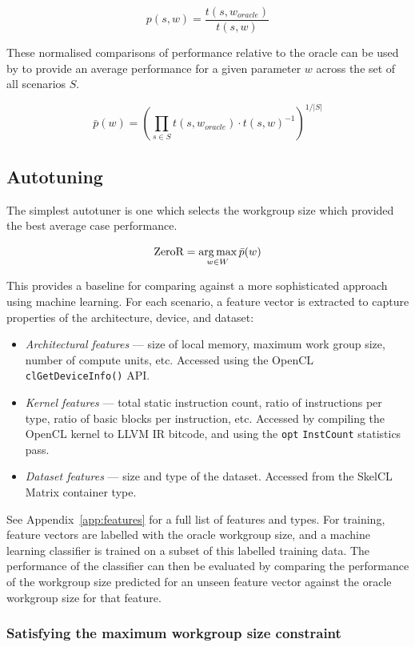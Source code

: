 \[p(s,w) = \frac{t(s,w_{oracle})}{t(s,w)}\]

These normalised comparisons of performance relative to the oracle can
be used by to provide an average performance for a given parameter $w$
across the set of all scenarios $S$.

\[\bar{p}(w) = \left(\prod_{s \in S} t(s,w_{oracle}) \cdot t(s,w)^{-1} \right)^{1/|S|}\]

\subsection{Autotuning}
The simplest autotuner is one which selects the workgroup size which
provided the best average case performance.

\[ \text{ZeroR} = \operatorname*{arg\,max}_{w \in W} \bar{p}(w) \]

This provides a baseline for comparing against a more sophisticated
approach using machine learning. For each scenario, a feature vector
is extracted to capture properties of the architecture, device, and
dataset:

\begin{itemize}
\item \emph{Architectural features} --- size of local memory, maximum
  work group size, number of compute units, etc. Accessed using the
  OpenCL \texttt{clGetDeviceInfo()} API.
\item \emph{Kernel features} --- total static instruction count, ratio
  of instructions per type, ratio of basic blocks per instruction,
  etc. Accessed by compiling the OpenCL kernel to LLVM IR bitcode, and
  using the \texttt{opt} \texttt{InstCount} statistics pass.
\item \emph{Dataset features} --- size and type of the
  dataset. Accessed from the SkelCL Matrix container type.
\end{itemize}

See Appendix~\ref{app:features} for a full list of features and
types. For training, feature vectors are labelled with the oracle
workgroup size, and a machine learning classifier is trained on a
subset of this labelled training data. The performance of the
classifier can then be evaluated by comparing the performance of the
workgroup size predicted for an unseen feature vector against the
oracle workgroup size for that feature.

\subsubsection{Satisfying the maximum workgroup size constraint}

